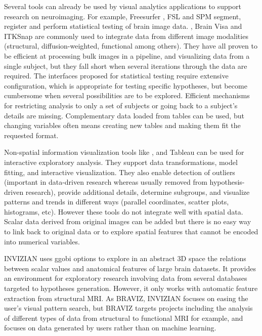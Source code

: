 \documentclass[twocolumn]{svjour3}
\begin{document}
Several tools can already be used by visual analytics applications to support research on neuroimaging. For example, Freesurfer \cite{fischl_freesurfer_2012}, FSL \cite{jenkinson_fsl_2012} and SPM \cite{friston_statistical_2006} segment, register and perform statistical testing of brain image data. \cite{fedorov_3d_2012}, Brain Visa \cite{cointepas_brainvisa:_2001} and ITKSnap \cite{yushkevich_user-guided_2006} are commonly used to integrate data from different image modalities (structural, diffusion-weighted, functional among others). They have all proven to be efficient at processing bulk images in a pipeline, and visualizing data from a single subject, but they fall short when several iterations through the data are required. The interfaces proposed for statistical testing require extensive configuration, which is appropriate for testing specific hypotheses, but become cumbersome when several possibilities are to be explored. Efficient mechanisms for restricting analysis to only a set of subjects or going back to a subject's details are missing. Complementary data loaded from tables can be used, but changing variables often means creating new tables and making them fit the requested format.


Non-spatial information visualization tools like \cite{cook_interactive_2007}, and Tableau\cite{hanrahan_tableau_2003} can be used for interactive exploratory analysis. They support data transformations, model fitting, and interactive visualization. They also enable  detection of outliers (important in data-driven research whereas usually removed from hypothesis-driven research), provide additional details, determine subgroups, and visualize patterns and trends in different ways (parallel coordinates, scatter plots, histograms, etc). However these tools do not integrate well with spatial data. Scalar data derived from original images can be added but there is no easy way to link back to original data or to explore spatial features that cannot be encoded into numerical variables.


INVIZIAN \cite{bowman_query-based_2011}\cite{bowman_feature-similarity_2012}\cite{bowman_visual_2012} uses ggobi options to explore in an abstract 3D space the relations between scalar values and anatomical features of large brain datasets. It provides an environment for exploratory research involving data from several databases targeted to hypotheses generation. However, it only works with automatic feature extraction from structural MRI. As BRAVIZ, INVIZIAN focuses on easing the user’s visual pattern search, but BRAVIZ targets projects including the analysis of different types of data from structural to functional MRI for example, and focuses on data generated by users rather than on machine learning. 
\end{document}
